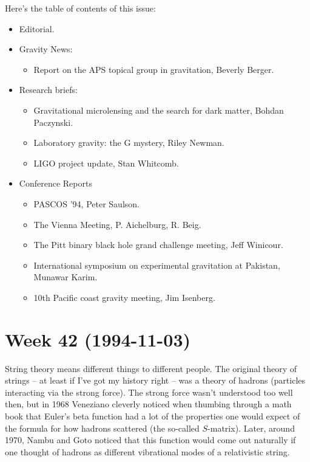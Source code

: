 \documentclass{article}
\def\tightlist{}
\begin{document}
Here's the table of contents of this issue:

\begin{itemize}
\tightlist
\item
  Editorial.
\item
  Gravity News:

  \begin{itemize}
  \tightlist
  \item
    Report on the APS topical group in gravitation, Beverly Berger.
  \end{itemize}
\item
  Research briefs:

  \begin{itemize}
  \tightlist
  \item
    Gravitational microlensing and the search for dark matter, Bohdan
    Paczynski.
  \item
    Laboratory gravity: the G mystery, Riley Newman.
  \item
    LIGO project update, Stan Whitcomb.
  \end{itemize}
\item
  Conference Reports

  \begin{itemize}
  \tightlist
  \item
    PASCOS '94, Peter Saulson.
  \item
    The Vienna Meeting, P. Aichelburg, R. Beig.
  \item
    The Pitt binary black hole grand challenge meeting, Jeff Winicour.
  \item
    International symposium on experimental gravitation at Pakistan,
    Munawar Karim.
  \item
    10th Pacific coast gravity meeting, Jim Isenberg.
  \end{itemize}
\end{itemize}
\hypertarget{week42}{%
\section{Week 42 (1994-11-03)}\label{week42}}

String theory means different things to different people. The original
theory of strings -- at least if I've got my history right -- was a
theory of hadrons (particles interacting via the strong force). The
strong force wasn't understood too well then, but in 1968 Veneziano
cleverly noticed when thumbing through a math book that Euler's beta
function had a lot of the properties one would expect of the formula for
how hadrons scattered (the so-called \(S\)-matrix). Later, around 1970,
Nambu and Goto noticed that this function would come out naturally if
one thought of hadrons as different vibrational modes of a relativistic
string.
\end{document}
